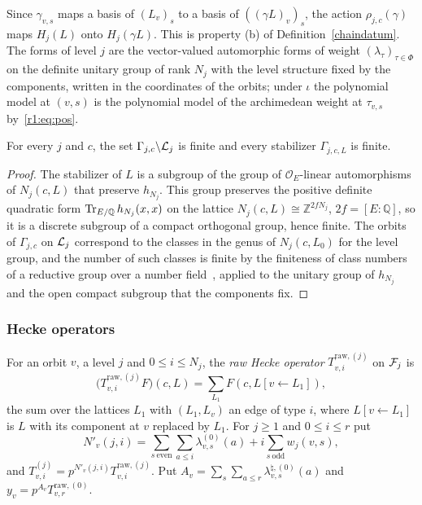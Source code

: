 Since $\gamma_{v,s}$ maps a basis of $(L_v)_s$ to a basis of $((\gamma L)_v)_s$, the action $\rho_{j,c}(\gamma)$ maps $H_j(L)$ onto $H_j(\gamma L)$. This is property (b) of Definition~\ref{chaindatum}. The forms of level $j$ are the vector-valued automorphic forms of weight $(\lambda_\tau)_{\tau\in\Phi}$ on the definite unitary group of rank $N_j$ with the level structure fixed by the components, written in the coordinates of the orbits; under $\iota$ the polynomial model at $(v,s)$ is the polynomial model of the archimedean weight at $\tau_{v,s}$ by~\eqref{r1:eq:pos}.

\begin{lemma}[Finiteness]\label{r1:lem:finite}
For every $j$ and $c$, the set $\Gamma_{j,c}\backslash\mathcal L_j$ is finite and every stabilizer $\Gamma_{j,c,L}$ is finite.
\end{lemma}

\begin{proof}
The stabilizer of $L$ is a subgroup of the group of $\mathcal O_E$-linear automorphisms of $N_j(c,L)$ that preserve $h_{N_j}$. This group preserves the positive definite quadratic form $\operatorname{Tr}_{E/\mathbb Q}h_{N_j}(x,x)$ on the lattice $N_j(c,L)\cong\mathbb Z^{2fN_j}$, $2f=[E:\mathbb Q]$, so it is a discrete subgroup of a compact orthogonal group, hence finite. The orbits of $\Gamma_{j,c}$ on $\mathcal L_j$ correspond to the classes in the genus of $N_j(c,L_0)$ for the level group, and the number of such classes is finite by the finiteness of class numbers of a reductive group over a number field~\cite[Theorem~5.1]{borel63}, applied to the unitary group of $h_{N_j}$ and the open compact subgroup that the components fix.
\end{proof}

\subsubsection{Hecke operators}

\begin{definition}\label{r1:def:hecke}
For an orbit $v$, a level $j$ and $0\le i\le N_j$, the \emph{raw Hecke operator} $T^{\mathrm{raw},(j)}_{v,i}$ on $\mathcal F_j$ is
\[
\big(T^{\mathrm{raw},(j)}_{v,i}F\big)(c,L)=\sum_{L_1}F(c,L[v\leftarrow L_1]),
\]
the sum over the lattices $L_1$ with $(L_1,L_v)$ an edge of type $i$, where $L[v\leftarrow L_1]$ is $L$ with its component at $v$ replaced by $L_1$. For $j\ge1$ and $0\le i\le r$ put
\begin{equation}\label{r1:eq:Nprime}
N'_v(j,i)=\sum_{s\ \mathrm{even}}\sum_{a\le i}\lambda^{(0)}_{v,s}(a)+i\sum_{s\ \mathrm{odd}}w_j(v,s),
\end{equation}
and $T^{(j)}_{v,i}=p^{N'_v(j,i)}T^{\mathrm{raw},(j)}_{v,i}$. Put $A_v=\sum_s\sum_{a\le r}\lambda^{\natural,(0)}_{v,s}(a)$ and $y_v=p^{A_v}T^{\mathrm{raw},(0)}_{v,r}$.
\end{definition}

